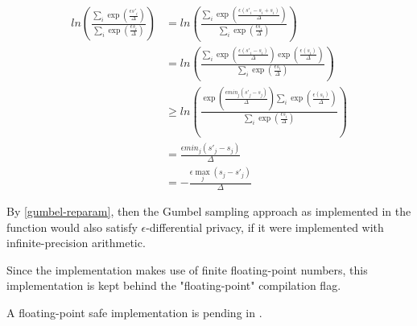 \documentclass{article}
\begin{document}
\begin{align*}
    ln\left(\frac{\sum_{i} \exp(\frac{\epsilon s'_i}{\Delta})}{\sum_{i} \exp(\frac{\epsilon s_i}{\Delta})}\right)
    &= ln\left(\frac{\sum_{i} \exp(\frac{\epsilon (s'_i - s_i + s_i)}{\Delta})}{\sum_{i} \exp(\frac{\epsilon s_i}{\Delta})}\right) \\
    &= ln\left(\frac{\sum_{i} \exp(\frac{\epsilon (s'_i - s_i)}{\Delta})\exp(\frac{\epsilon (s_i)}{\Delta})}{\sum_{i} \exp(\frac{\epsilon s_i}{\Delta})}\right) \\
    &\geq ln\left(\frac{\exp(\frac{\epsilon min_j(s'_j - s_j)}{\Delta}) \sum_{i} \exp(\frac{\epsilon (s_i)}{\Delta})}{\sum_{i} \exp(\frac{\epsilon s_i}{\Delta})}\right) \\
    &= \frac{\epsilon min_j(s'_j - s_j)}{\Delta} \\
    &= -\frac{\epsilon \max_j (s_j - s'_j)}{\Delta}
\end{align*}

By \ref{gumbel-reparam}, then the Gumbel sampling approach as implemented in the function would also satisfy $\epsilon$-differential privacy,
if it were implemented with infinite-precision arithmetic.

Since the implementation makes use of finite floating-point numbers, 
this implementation is kept behind the "floating-point" compilation flag.

A floating-point safe implementation is pending in .




\end{document}
